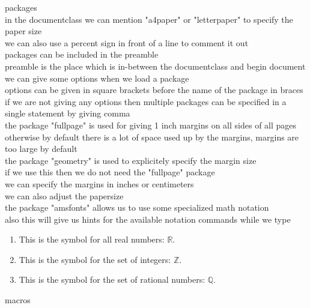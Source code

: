 \documentclass[10pt, a4paper]{article}
\begin{document}
packages\\


in the documentclass we can mention "a4paper" or "letterpaper" to specify the paper size\\

we can also use a percent sign in front of a line to comment it out\\

packages can be included in the preamble\\
preamble is the place which is in-between the documentclass and begin document\\
we can give some options when we load a package\\
options can be given in square brackets before the name of the package in braces\\
if we are not giving any options then multiple packages can be specified in a single statement by giving comma\\


the package "fullpage" is used for giving 1 inch margins on all sides of all pages\\
otherwise by default there is a lot of space used up by the margins, margins are too large by default\\

the package "geometry" is used to explicitely specify the margin size\\
if we use this then we do not need the "fullpage" package\\
we can specify the margins in inches or centimeters\\
we can also adjust the papersize\\

the package "amsfonts" allows us to use some specialized math notation\\
also this will give us hints for the available notation commands while we type\\

\begin{enumerate}

\item This is the symbol for all real numbers: $\mathbb{R}$.
\item This is the symbol for the set of integers: $\mathbb{Z}$.
\item This is the symbol for the set of rational numbers: $\mathbb{Q}$.

\end{enumerate}


macros\\
\end{document}
